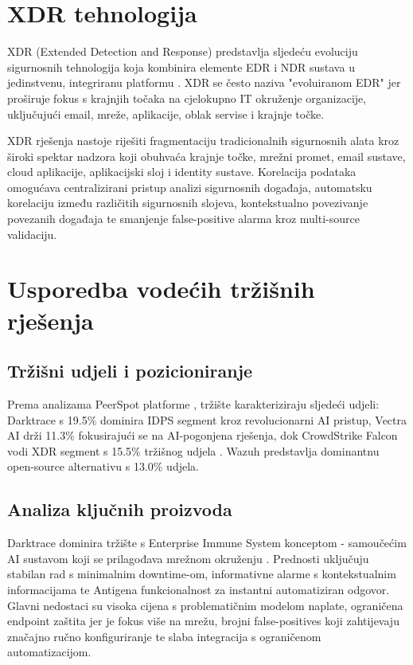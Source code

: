 \documentclass[utf8, seminar]{fer}
\begin{document}
\chapter{XDR tehnologija}

XDR (Extended Detection and Response) predstavlja sljedeću evoluciju sigurnosnih tehnologija koja kombinira elemente EDR i NDR sustava u jedinstvenu, integriranu platformu \cite{corelight_xdr, paloalto_xdr, crowdstrike_xdr}. XDR se često naziva "evoluiranom EDR" jer proširuje fokus s krajnjih točaka na cjelokupno IT okruženje organizacije, uključujući email, mreže, aplikacije, oblak servise i krajnje točke.

XDR rješenja nastoje riješiti fragmentaciju tradicionalnih sigurnosnih alata kroz široki spektar nadzora koji obuhvaća krajnje točke, mrežni promet, email sustave, cloud aplikacije, aplikacijski sloj i identity sustave. Korelacija podataka omogućava centralizirani pristup analizi sigurnosnih događaja, automatsku korelaciju između različitih sigurnosnih slojeva, kontekstualno povezivanje povezanih događaja te smanjenje false-positive alarma kroz multi-source validaciju.

\chapter{Usporedba vodećih tržišnih rješenja}

\section{Tržišni udjeli i pozicioniranje}

Prema analizama PeerSpot platforme \cite{peerspot_snort_darktrace}, tržište karakteriziraju sljedeći udjeli: Darktrace s 19.5\% dominira IDPS segment kroz revolucionarni AI pristup, Vectra AI drži 11.3\% fokusirajući se na AI-pogonjena rješenja, dok CrowdStrike Falcon vodi XDR segment s 15.5\% tržišnog udjela \cite{g2_crowdstrike_comparison}. Wazuh predstavlja dominantnu open-source alternativu s 13.0\% udjela.

\section{Analiza ključnih proizvoda}

Darktrace dominira tržište s Enterprise Immune System konceptom - samoučećim AI sustavom koji se prilagođava mrežnom okruženju \cite{peerspot_darktrace_pros}. Prednosti uključuju stabilan rad s minimalnim downtime-om, informativne alarme s kontekstualnim informacijama te Antigena funkcionalnost za instantni automatiziran odgovor. Glavni nedostaci su visoka cijena s problematičnim modelom naplate, ograničena endpoint zaštita jer je fokus više na mrežu, brojni false-positives koji zahtijevaju značajno ručno konfiguriranje te slaba integracija s ograničenom automatizacijom.
\end{document}
